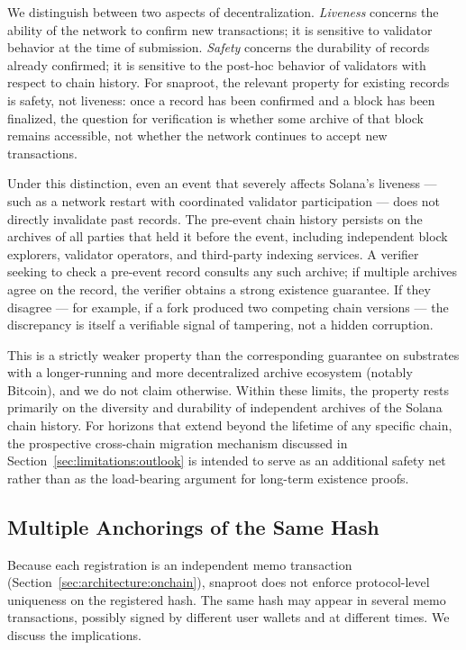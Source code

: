 \documentclass[11pt,a4paper]{article}
\begin{document}
We distinguish between two aspects of decentralization. \emph{Liveness}
concerns the ability of the network to confirm new transactions; it is
sensitive to validator behavior at the time of submission. \emph{Safety}
concerns the durability of records already confirmed; it is sensitive to
the post-hoc behavior of validators with respect to chain history. For
snaproot, the relevant property for existing records is safety, not
liveness: once a record has been confirmed and a block has been
finalized, the question for verification is whether some archive of
that block remains accessible, not whether the network continues to
accept new transactions.

Under this distinction, even an event that severely affects Solana's
liveness --- such as a network restart with coordinated validator
participation --- does not directly invalidate past records. The
pre-event chain history persists on the archives of all parties that
held it before the event, including independent block explorers,
validator operators, and third-party indexing services. A verifier
seeking to check a pre-event record consults any such archive; if
multiple archives agree on the record, the verifier obtains a strong
existence guarantee. If they disagree --- for example, if a fork
produced two competing chain versions --- the discrepancy is itself a
verifiable signal of tampering, not a hidden corruption.

This is a strictly weaker property than the corresponding guarantee on
substrates with a longer-running and more decentralized archive
ecosystem (notably Bitcoin), and we do not claim otherwise. Within
these limits, the property rests primarily on the diversity and
durability of independent archives of the Solana chain history. For
horizons that extend beyond the lifetime of any specific chain, the
prospective cross-chain migration mechanism discussed in
Section~\ref{sec:limitations:outlook} is intended to serve as an
additional safety net rather than as the load-bearing argument for
long-term existence proofs.

\subsection{Multiple Anchorings of the Same Hash}
\label{sec:security:duplicate}

Because each registration is an independent memo transaction
(Section~\ref{sec:architecture:onchain}), snaproot does not enforce
protocol-level uniqueness on the registered hash. The same hash may
appear in several memo transactions, possibly signed by different user
wallets and at different times. We discuss the implications.
\end{document}
